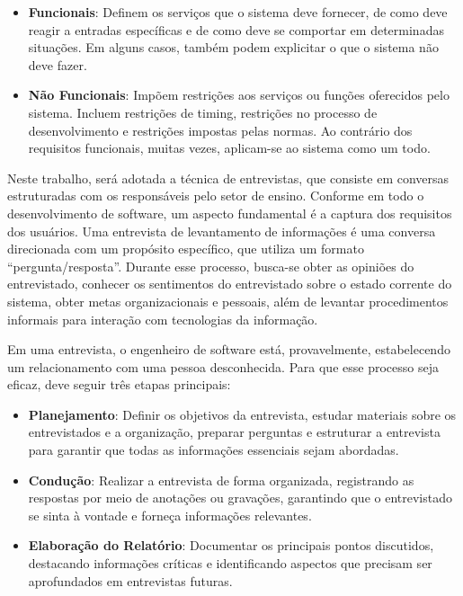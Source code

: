 \begin{itemize}
    \item \textbf{Funcionais}: Definem os serviços que o sistema deve fornecer, de como deve reagir a entradas específicas e de como deve se comportar em determinadas situações. Em alguns casos, também podem explicitar o que o sistema não deve fazer.
    \item \textbf{Não Funcionais}: Impõem restrições aos serviços ou funções oferecidos pelo sistema. Incluem restrições de timing, restrições no processo de desenvolvimento e restrições impostas pelas normas. Ao contrário dos requisitos funcionais, muitas vezes, aplicam-se ao sistema como um todo.
\end{itemize}

Neste trabalho, será adotada a técnica de entrevistas, que consiste em conversas estruturadas com os responsáveis pelo setor de ensino. Conforme  em todo o desenvolvimento de software, um aspecto fundamental é a captura dos requisitos dos usuários. Uma entrevista de levantamento de informações é uma conversa direcionada com um propósito específico, que utiliza um formato ``pergunta/resposta''. Durante esse processo, busca-se obter as opiniões do entrevistado, conhecer os sentimentos do entrevistado sobre o estado corrente do sistema, obter metas organizacionais e pessoais, além de levantar procedimentos informais para interação com tecnologias da informação.

Em uma entrevista, o engenheiro de software está, provavelmente, estabelecendo um relacionamento com uma pessoa desconhecida. Para que esse processo seja eficaz, deve seguir três etapas principais:

\begin{itemize}
    \item \textbf{Planejamento}: Definir os objetivos da entrevista, estudar materiais sobre os entrevistados e a organização, preparar perguntas e estruturar a entrevista para garantir que todas as informações essenciais sejam abordadas.
    \item \textbf{Condução}: Realizar a entrevista de forma organizada, registrando as respostas por meio de anotações ou gravações, garantindo que o entrevistado se sinta à vontade e forneça informações relevantes.
    \item \textbf{Elaboração do Relatório}: Documentar os principais pontos discutidos, destacando informações críticas e identificando aspectos que precisam ser aprofundados em entrevistas futuras.
\end{itemize}

